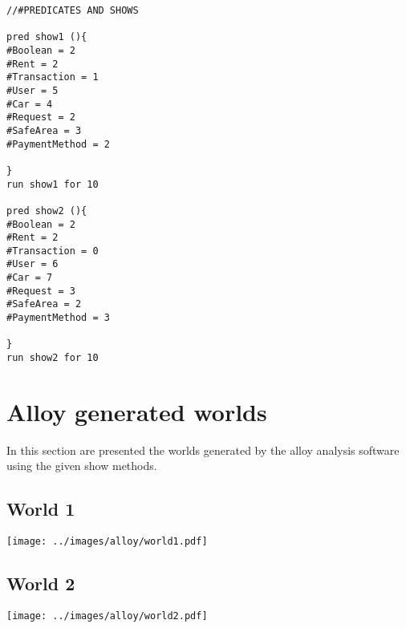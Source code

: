 \begin{lstlisting}[breaklines=true]
//#PREDICATES AND SHOWS

pred show1 (){
#Boolean = 2
#Rent = 2
#Transaction = 1
#User = 5
#Car = 4
#Request = 2
#SafeArea = 3
#PaymentMethod = 2

}
run show1 for 10

pred show2 (){
#Boolean = 2
#Rent = 2
#Transaction = 0
#User = 6
#Car = 7
#Request = 3
#SafeArea = 2
#PaymentMethod = 3

}
run show2 for 10

\end{lstlisting}

\section{Alloy generated worlds}
In this section are presented the worlds generated by the alloy analysis software using the given show methods.
\subsection{World 1}
\begin{center}
\texttt{[image: ../images/alloy/world1.pdf]}
\end{center}

\subsection{World 2}
\begin{center}
\texttt{[image: ../images/alloy/world2.pdf]}
\end{center}